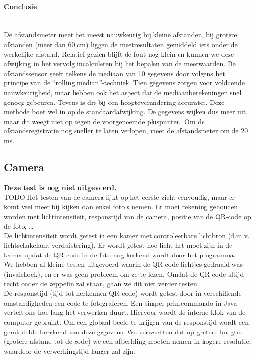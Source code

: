 \documentclass[eind]{penoverslag}
\begin{document}
\paragraph{Conclusie} ~\\ 
De afstandsmeter meet het meest nauwkeurig bij kleine afstanden, bij grotere afstanden (meer dan 60 cm) liggen de meetresultaten gemiddeld iets onder de werkelijke afstand. Relatief gezien blijft de fout nog klein en kunnen we deze afwijking in het vervolg incalculeren bij het bepalen van de meetwaarden. De afstandssensor geeft telkens de mediaan van 10 gegevens door volgens het principe van de “rolling median”-techniek. Tien gegevens zorgen voor voldoende nauwkeurigheid, maar hebben ook het aspect dat de mediaanberekeningen snel genoeg gebeuren. Tevens is dit bij een hoogteverandering accurater. Deze methode boet wel in op de standaardafwijking. De gegevens wijken dus meer uit, maar dit weegt niet op tegen de voorgenoemde pluspunten. Om de afstandsregistratie nog sneller te laten verlopen, meet de afstandsmeter om de 20 ms.

\subsection{Camera}

\textbf{Deze test is nog niet uitgevoerd.} \\
TODO
Het testen van de camera lijkt op het eerste zicht eenvoudig, maar er komt veel meer bij kijken dan enkel foto's nemen. Er moet rekening gehouden worden met lichtintensiteit, responstijd van de camera, positie van de QR-code op de foto, \ldots \\

De lichtintensiteit wordt getest in een kamer met controleerbare lichtbron (d.m.v. lichtschakelaar, verduistering). Er wordt getest hoe licht het moet zijn in de kamer opdat de QR-code in de foto nog herkend wordt door het programma. \\

We hebben al kleine testen uitgevoerd waarin de QR-code lichtjes gedraaid was (invalshoek), en er was geen probleem om ze te lezen. Omdat de QR-code altijd recht onder de zeppelin zal staan, gaan we dit niet verder testen. \\

De responstijd (tijd tot herkennen QR-code) wordt getest door in verschillende omstandigheden een code te fotograferen. Een simpel printcommando in Java vertelt ons hoe lang het verwerken duurt. Hiervoor wordt de interne klok van de computer gebruikt. Om een globaal beeld te krijgen van de responstijd wordt een gemiddelde berekend van deze gegevens. We verwachten dat op grotere hoogtes (grotere afstand tot de code) we een afbeelding moeten nemen in hogere resolutie, waardoor de verwerkingstijd langer zal zijn. \\
\end{document}
